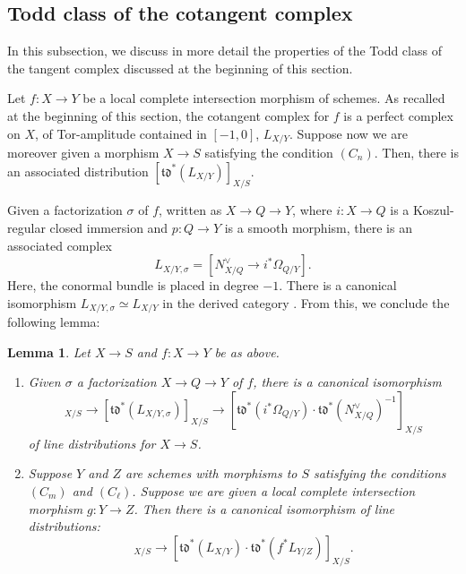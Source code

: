 \documentclass[JEP,XML,SOM,Unicode,published]{cedram}
\theoremstyle{plain}
\newtheorem{lemma}[theorem]{Lemma}
\theoremstyle{definition}
\newcommand{\tdfrak}{\mathfrak {td}}
\begin{document}
\subsection{Todd class of the cotangent complex }\label{subsubsec:td-class-tangent}
In this subsection, we discuss in more detail the properties of the Todd class of the tangent complex discussed at the beginning of this section.

Let $f: X\to Y$ be a local complete intersection morphism of schemes. As recalled at the beginning of this section, the cotangent complex for $f$ is a perfect complex on $X$, of Tor-amplitude contained in $[-1,0]$, $L_{X/Y}$. Suppose now we are moreover given a morphism $X \to S$ satisfying the condition $(C_n)$. Then, there is an associated distribution $[\tdfrak^*(L_{X/Y})]_{X/S}$.

Given a factorization $\sigma$ of $f$, written as $X\to Q\to Y$, where $i\colon X\to Q$ is a Koszul-regular closed immersion and $p\colon Q \to Y$ is a smooth morphism, there is an associated complex
\begin{equation}\label{eq:cotangent}
L_{X/Y, \sigma} = [N_{X/Q}^\vee \to i^* \Omega_{Q/Y}].
\end{equation}
Here, the conormal bundle is placed in degree $-1$. There is a canonical isomorphism $L_{X/Y, \sigma}\simeq L_{X/Y}$ in the derived category \cite[\href{https://stacks.math.columbia.edu/tag/0FV4}{0FV4}]{stacks-project}. From this, we conclude the following lemma:

\begin{lemma}\label{lemma:td-factorisation-independence}
Let $X \to S$ and $f\colon X\to Y$ be as above.
\begin{enumerate}
\item Given $\sigma$ a factorization $X\to Q\to Y$ of $f$, there is a canonical isomorphism
\begin{displaymath}
[\tdfrak^*(L_{X/Y})]_{X/S} \to [\tdfrak^*(L_{X/Y,\sigma})]_{X/S} \to [\tdfrak^*(i^\ast \Omega_{Q/Y}) \cdot \tdfrak^*(N^\vee_{X/Q})^{-1}]_{X/S}
\end{displaymath}
of line distributions for $X\to S$.
\item Suppose $Y$ and $Z$ are schemes with morphisms to $S$ satisfying the conditions $(C_m)$ and $(C_{\ell})$. Suppose we are given a local complete intersection morphism \hbox{$g \colon Y\to Z$}. Then there is a canonical isomorphism of line distributions:
\begin{displaymath}
[\tdfrak^*(L_{X/Z})]_{X/S} \to [\tdfrak^*(L_{X/Y}) \cdot \tdfrak^* (f^\ast L_{Y/Z})]_{X/S}.
\end{displaymath}
\end{enumerate}
\end{lemma}
\end{document}

